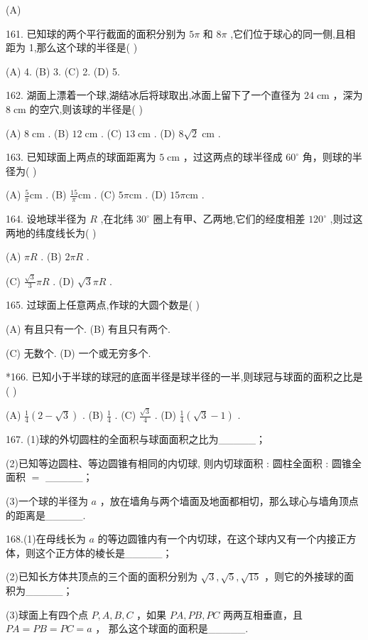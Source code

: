 \documentclass[10pt]{article}
\begin{document}
(A)

161. 已知球的两个平行截面的面积分别为 \({5\pi }\) 和 \({8\pi }\) ,它们位于球心的同一侧,且相距为 1,那么这个球的半径是( )

(A) 4. (B) 3. (C) 2. (D) 5.

162. 湖面上漂着一个球,湖结冰后将球取出,冰面上留下了一个直径为 \({24}\mathrm{\;{cm}}\) ，深为 \(8\mathrm{\;{cm}}\) 的空穴,则该球的半径是( )

(A) \(8\mathrm{\;{cm}}\) . (B) \({12}\mathrm{\;{cm}}\) . (C) \({13}\mathrm{\;{cm}}\) . (D) \(8\sqrt{2}\mathrm{\;{cm}}\) .

163. 已知球面上两点的球面距离为 \(5\mathrm{\;{cm}}\) ，过这两点的球半径成 \({60}^{ \circ  }\) 角，则球的半径为( )

(A) \(\frac{5}{\pi }\mathrm{{cm}}\) . (B) \(\frac{15}{\pi }\mathrm{{cm}}\) . (C) \({5\pi }\mathrm{{cm}}\) . (D) \({15\pi }\mathrm{{cm}}\) .

164. 设地球半径为 \(R\) ,在北纬 \({30}^{ \circ  }\) 圈上有甲、乙两地,它们的经度相差 \({120}^{ \circ  }\) ,则过这两地的纬度线长为( )

(A) \({\pi R}\) . (B) \({2\pi R}\) .

(C) \(\frac{\sqrt{3}}{3}{\pi R}\) . (D) \(\sqrt{3}{\pi R}\) .

165. 过球面上任意两点,作球的大圆个数是( )

(A) 有且只有一个. (B) 有且只有两个.

(C) 无数个. (D) 一个或无穷多个.

*166. 已知小于半球的球冠的底面半径是球半径的一半,则球冠与球面的面积之比是( )

(A) \(\frac{1}{4}\left( {2 - \sqrt{3}}\right)\) . (B) \(\frac{1}{4}\) . (C) \(\frac{\sqrt{3}}{4}\) . (D) \(\frac{1}{4}\left( {\sqrt{3} - 1}\right)\) .

167. (1)球的外切圆柱的全面积与球面面积之比为\_\_\_\_\_；

(2)已知等边圆柱、等边圆锥有相同的内切球, 则内切球面积 : 圆柱全面积 : 圆锥全面积 \(=\) \_\_\_\_\_；

(3)一个球的半径为 \(a\) ，放在墙角与两个墙面及地面都相切，那么球心与墙角顶点的距离是\_\_\_\_\_.

168.(1)在母线长为 \(a\) 的等边圆锥内有一个内切球，在这个球内又有一个内接正方体，则这个正方体的棱长是\_\_\_\_\_；

(2)已知长方体共顶点的三个面的面积分别为 \(\sqrt{3},\sqrt{5},\sqrt{15}\) ，则它的外接球的面积为\_\_\_\_\_；

(3)球面上有四个点 \(P,A,B,C\) ，如果 \({PA},{PB},{PC}\) 两两互相垂直，且 \({PA} = {PB} = {PC} = a\) ， 那么这个球面的面积是\_\_\_\_\_.
\end{document}

